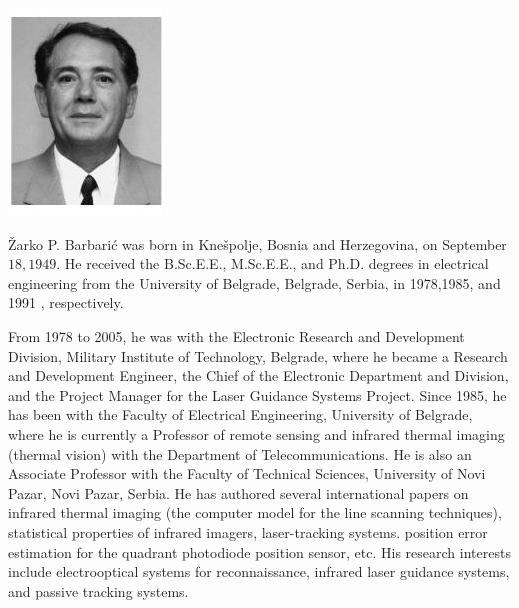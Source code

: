 \documentclass[10pt]{article}
\begin{document}
\includegraphics[max width=\textwidth]{5ecfdecb1168916efbeaf9054b715324-10(1)}

Žarko P. Barbarić was born in Knešpolje, Bosnia and Herzegovina, on September \(18,1949 .\) He received the B.Sc.E.E., M.Sc.E.E., and Ph.D. degrees in electrical engineering from the University of Belgrade, Belgrade, Serbia, in 1978,1985, and 1991 , respectively.

From 1978 to 2005, he was with the Electronic Research and Development Division, Military Institute of Technology, Belgrade, where he became a Research and Development Engineer, the Chief of the Electronic Department and Division, and the Project Manager for the Laser Guidance Systems Project. Since 1985, he has been with the Faculty of Electrical Engineering, University of Belgrade, where he is currently a Professor of remote sensing and infrared thermal imaging (thermal vision) with the Department of Telecommunications. He is also an Associate Professor with the Faculty of Technical Sciences, University of Novi Pazar, Novi Pazar, Serbia. He has authored several international papers on infrared thermal imaging (the computer model for the line scanning techniques), statistical properties of infrared imagers, laser-tracking systems. position error estimation for the quadrant photodiode position sensor, etc. His research interests include electrooptical systems for reconnaissance, infrared laser guidance systems, and passive tracking systems.
\end{document}
